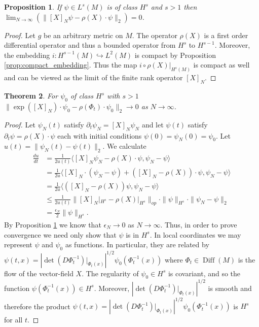 \documentclass[12pt]{amsart}
\newtheorem{thm}{Theorem}[section]
\newtheorem{prop}[thm]{Proposition}
\DeclareMathOperator{\Diff}{Diff}
\begin{document}
\begin{prop} \label{prop:inf_convergence}
	If $\psi \in L^s(M)$ is of class $H^s$ and $s>1$ then
	$\lim_{N \to \infty}( \| [X]_N \psi - \rho(X) \cdot \psi \|_{2} ) = 0$.
\end{prop}
\begin{proof}
	Let $g$ be an arbitrary metric on $M$.
	The operator $\rho(X)$ is a first order differential operator and thus a bounded operator from $H^{s}$
	to $H^{s-1}$.
	Moreover, the embedding $i: H^{s-1}(M) \hookrightarrow L^2(M)$ is compact by Proposition \ref{prop:compact_embedding}.
	Thus the map $i \circ \rho(X) |_{H^s(M)}$ is compact as well and can be viewed as the limit of the finite rank operator $[X]_N$.
\end{proof}

\begin{thm} \label{thm:convergence}
	For $\psi_0$ of class $H^s$ with $s>1$
	$\| \exp([X]_N) \cdot \psi_0 - \rho(\Phi_t) \cdot \psi_0 \|_{2} \to 0$ as $N \to \infty$.
\end{thm}

\begin{proof}
	Let $\psi_N(t)$ satisfy $\partial_t \psi_N = [X]_N \psi_N$ and let $\psi(t)$ satisfy $\partial_t \psi = \rho(X) \cdot \psi$ each with initial conditions $\psi(0) = \psi_N(0) = \psi_0$.
	Let $u(t) = \| \psi_N(t) - \psi(t) \|_{2}$.
	We calculate
	\begin{align*}
		\frac{du}{dt} &= \frac{1}{2u(t)} \langle [X]_N \psi_N - \rho(X) \cdot \psi , \psi_N - \psi \rangle \\
			&= \frac{1}{2u} \langle [X]_N \cdot (\psi_N - \psi) + ([X]_N - \rho(X) ) \cdot \psi , \psi_N - \psi \rangle \\
			&= \frac{1}{2u} \langle ([X]_N - \rho(X) ) \psi , \psi_N - \psi \rangle \\
			&\leq \frac{1}{2u(t)} \| [X]_N |_{H^s} - \rho(X)|_{H^s} \|_{op} \cdot \| \psi \|_{H^s} \cdot \| \psi_N - \psi \|_2 \\
			&= \frac{\epsilon_N}{2} \| \psi \|_{H^s}.
	\end{align*}
	By Proposition \ref{prop:inf_convergence} we know that $\epsilon_N \to 0$ as $N \to \infty$.
	Thus, in order to prove convergence we need only show that $\psi$ is in $H^s$.
	In local coordinates we may represent $\psi$ and $\psi_0$ as functions.
	In particular, they are related by
	$\psi(t , x) = \left| \det (D\Phi_t^{-1})|_{\Phi_t(x)}  \right|^{1/2} \psi_0( \Phi_t^{-1}(x) )$
	where $\Phi_t \in \Diff(M)$ is the flow of the vector-field $X$.
	The regularity of $\psi_0 \in H^s$ is covariant, and so the function $\psi( \Phi_t^{-1}(x) ) \in H^s$.
	Moreover, $\left| \det (D\Phi_t^{-1})|_{\Phi_t(x)}  \right|^{1/2}$ is smooth and therefore the product $\psi(t,x) = \left| \det (D\Phi_t^{-1})|_{\Phi_t(x)}  \right|^{1/2} \psi_0( \Phi_t^{-1}(x) )$
	is $H^s$ for all $t$.
\end{proof}
\end{document}
